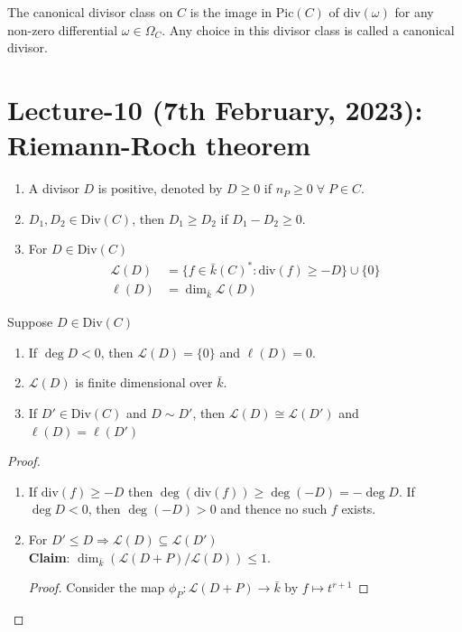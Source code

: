 \documentclass[oneside, 12pt]{scrbook}
\theoremstyle{theorem}
\begin{document}
\begin{definition}
The canonical divisor class on $C$ is the image in $\mathrm{Pic}(C)$ of $\mathrm{div}(\omega)$ for any non-zero differential $\omega \in \Omega_{C}$. Any choice in this divisor class is called a canonical divisor.
\end{definition}

\chapter{Lecture-10 (7th February, 2023): Riemann-Roch theorem }

\begin{definition}
\begin{enumerate}
\item A divisor $D$ is positive, denoted by $D\geq 0$ if $n_{P} \geq 0 \; \forall \; P \in C$.
\item $D_{1},D_{2} \in \mathrm{Div}(C)$, then $D_{1} \geq D_{2}$ if $D_{1}-D_{2} \geq 0$.
\item For $D \in \mathrm{Div}(C)$ 
\begin{align*}
\mathcal{L}(D) &= \{f \in \bar{k}(C)^{*} : \mathrm{div}(f) \geq -D\} \cup \{0\}\\
\ell(D) &= \dim_{\bar{k}}\mathcal{L}(D)
\end{align*}
\end{enumerate}
\end{definition}

\begin{proposition}
Suppose $D \in \mathrm{Div}(C)$
\begin{enumerate}
\item If $\deg D <0$, then $\mathcal{L}(D) = \{0\}$ and $\ell(D) = 0$.
\item $\mathcal{L}(D)$ is finite dimensional over $\bar{k}$.
\item If $D' \in \mathrm{Div}(C)$ and $D \sim D'$, then $\mathcal{L}(D) \cong \mathcal{L}(D')$ and $\ell(D)=\ell(D')$
\end{enumerate}
\end{proposition}

\begin{proof}
\begin{enumerate}
\item If $\mathrm{div}(f) \geq -D$ then $\deg (\mathrm{div}(f)) \geq \deg (-D) = -\deg D$. If $\deg D <0$, then $\deg (-D) >0$ and thence no such $f$ exists.
\item For $D' \le D \Rightarrow \mathcal{L}(D) \subseteq \mathcal{L}(D')$\\

\textbf{Claim}: $\dim_{\bar{k}}(\mathcal{L}(D+P)/\mathcal{L}(D)) \le 1$. 
\begin{proof}
Consider the map $\phi_{P}: \mathcal{L}(D+P) \rightarrow \bar{k}$ by $f \mapsto t^{r+1}$
\end{proof}
\end{enumerate}
\end{proof}
\end{document}
